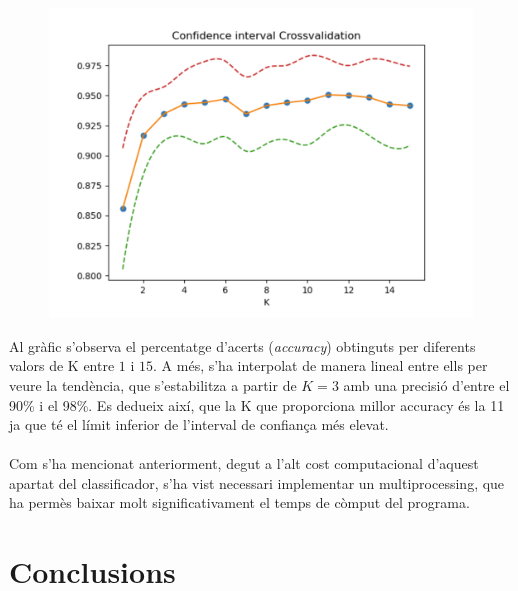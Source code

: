 \documentclass[a4paper, 11pt]{article}
\begin{document}
\begin{figure}[h!]
\centering
\includegraphics[scale=0.5]{crossvalidation.PNG}
\end{figure}
\hspace{-1.5em}Al gràfic s'observa el percentatge d’acerts (\textit{accuracy}) obtinguts per diferents valors de K entre $1$ i $15$. A més, s’ha interpolat de manera lineal entre ells per veure la tendència, que s'estabilitza a partir de $K=3$ amb una precisió d'entre el 90\% i el 98\%. Es dedueix així, que la K que proporciona millor accuracy és la 11 ja que té el límit inferior de l'interval de confiança més elevat.\\\\
Com s'ha mencionat anteriorment, degut a l’alt cost computacional d'aquest apartat del classificador, s'ha vist necessari implementar un multiprocessing, que ha permès baixar molt significativament el temps de còmput del programa.
\newpage

\section{Conclusions}
\end{document}
